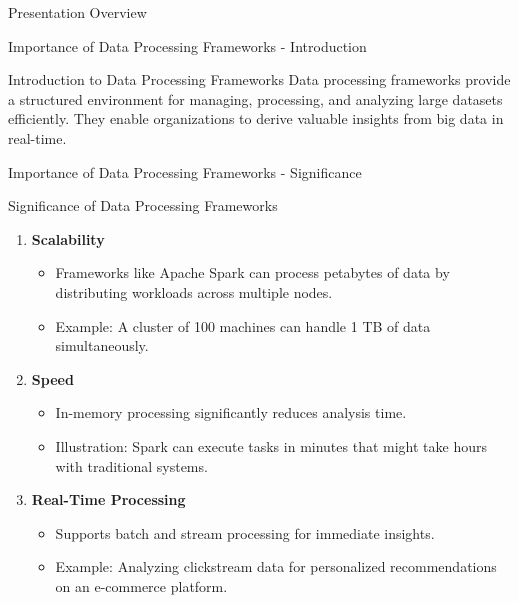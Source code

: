 \documentclass[aspectratio=169]{beamer}
\begin{document}
\begin{frame}[fragile]{Presentation Overview}
    \tableofcontents[hideallsubsections]
\end{frame}

\begin{frame}[fragile]{Importance of Data Processing Frameworks - Introduction}
    \begin{block}{Introduction to Data Processing Frameworks}
        Data processing frameworks provide a structured environment for managing, processing, and analyzing large datasets efficiently. 
        They enable organizations to derive valuable insights from big data in real-time.
    \end{block}
\end{frame}

\begin{frame}[fragile]{Importance of Data Processing Frameworks - Significance}
    \begin{block}{Significance of Data Processing Frameworks}
        \begin{enumerate}
            \item \textbf{Scalability} 
            \begin{itemize}
                \item Frameworks like Apache Spark can process petabytes of data by distributing workloads across multiple nodes.
                \item Example: A cluster of 100 machines can handle 1 TB of data simultaneously.
            \end{itemize}
            \item \textbf{Speed}
            \begin{itemize}
                \item In-memory processing significantly reduces analysis time.
                \item Illustration: Spark can execute tasks in minutes that might take hours with traditional systems.
            \end{itemize}
            \item \textbf{Real-Time Processing}
            \begin{itemize}
                \item Supports batch and stream processing for immediate insights.
                \item Example: Analyzing clickstream data for personalized recommendations on an e-commerce platform.
            \end{itemize}
        \end{enumerate}
    \end{block}
\end{frame}
\end{document}
